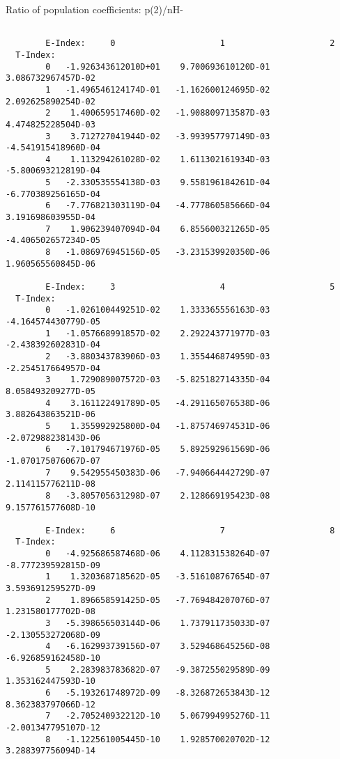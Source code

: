 \documentclass[12pt,dvipdfmx]{article}
\begin{document}
{ Ratio of population coefficients: p(2)/nH-

\begin{small}\begin{verbatim}

        E-Index:     0                     1                     2
  T-Index:
        0   -1.926343612010D+01    9.700693610120D-01    3.086732967457D-02
        1   -1.496546124174D-01   -1.162600124695D-02    2.092625890254D-02
        2    1.400659517460D-02   -1.908809713587D-03    4.474825228504D-03
        3    3.712727041944D-02   -3.993957797149D-03   -4.541915418960D-04
        4    1.113294261028D-02    1.611302161934D-03   -5.800693212819D-04
        5   -2.330535554138D-03    9.558196184261D-04   -6.770389256165D-04
        6   -7.776821303119D-04   -4.777860585666D-04    3.191698603955D-04
        7    1.906239407094D-04    6.855600321265D-05   -4.406502657234D-05
        8   -1.086976945156D-05   -3.231539920350D-06    1.960565560845D-06

        E-Index:     3                     4                     5
  T-Index:
        0   -1.026100449251D-02    1.333365556163D-03   -4.164574430779D-05
        1   -1.057668991857D-02    2.292243771977D-03   -2.438392602831D-04
        2   -3.880343783906D-03    1.355446874959D-03   -2.254517664957D-04
        3    1.729089007572D-03   -5.825182714335D-04    8.058493209277D-05
        4    3.161122491789D-05   -4.291165076538D-06    3.882643863521D-06
        5    1.355992925800D-04   -1.875746974531D-06   -2.072988238143D-06
        6   -7.101794671976D-05    5.892592961569D-06   -1.070175076067D-07
        7    9.542955450383D-06   -7.940664442729D-07    2.114115776211D-08
        8   -3.805705631298D-07    2.128669195423D-08    9.157761577608D-10

        E-Index:     6                     7                     8
  T-Index:
        0   -4.925686587468D-06    4.112831538264D-07   -8.777239592815D-09
        1    1.320368718562D-05   -3.516108767654D-07    3.593691259527D-09
        2    1.896658591425D-05   -7.769484207076D-07    1.231580177702D-08
        3   -5.398656503144D-06    1.737911735033D-07   -2.130553272068D-09
        4   -6.162993739156D-07    3.529468645256D-08   -6.926859162458D-10
        5    2.283983783682D-07   -9.387255029589D-09    1.353162447593D-10
        6   -5.193261748972D-09   -8.326872653843D-12    8.362383797066D-12
        7   -2.705240932212D-10    5.067994995276D-11   -2.001347795107D-12
        8   -1.122561005445D-10    1.928570020702D-12    3.288397756094D-14


\end{verbatim}
\end{small}}
\end{document}
